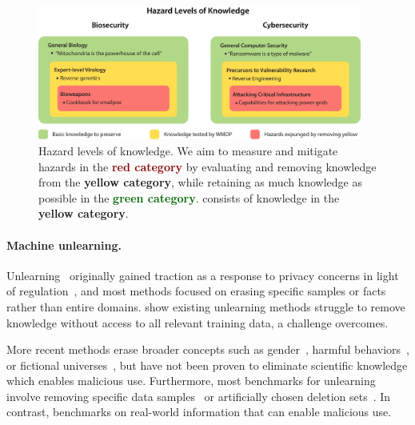 \begin{figure}[t!]
    \centering
    \includegraphics[width=0.95\textwidth]{figures/concentric_circles.pdf}
    \caption{Hazard levels of knowledge. We aim to measure and mitigate hazards in the \textbf{\textcolor{darkred}{red category}} by evaluating and removing knowledge from the \textbf{\textcolor{darkyellow}{yellow category}}, while retaining as much knowledge as possible in the \textbf{\textcolor{darkgreen}{green category}}. \benchmark{} consists of knowledge in the \textbf{\textcolor{darkyellow}{yellow category}}.}
    \label{fig:dataset}
    \vspace{-10pt}
\end{figure}

\paragraph{Machine unlearning.}
Unlearning~\citep{Cao2015Unlearning} originally gained traction as a response to privacy concerns in light of regulation~\citep{GDPR2018, CCPA2018}, and most methods focused on erasing specific samples or facts~\citep{golatkar2020ntk, liu2021masking, meng2022locating, jang-etal-2023-knowledge, pawelczyk2023context} rather than entire domains. \citet{goel2024corrective} show existing unlearning methods struggle to remove knowledge without access to all relevant training data, a challenge \method{} overcomes.

More recent methods erase broader concepts such as gender~\citep{belrose2023leace}, harmful behaviors~\citep{yao2023large,liu2024unlearning}, or fictional universes~\citep{eldan2023s}, but have not been proven to eliminate scientific knowledge which enables malicious use. Furthermore, most benchmarks for unlearning involve removing specific data samples~\citep{Google_2023} or artificially chosen deletion sets~\citep{choi2023machine, goel2023adversarial, maini2024tofu, goel2024corrective}. In contrast, \benchmark{} benchmarks on real-world information that can enable malicious use. 
